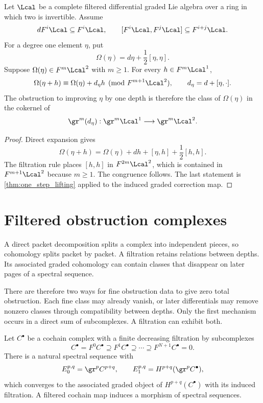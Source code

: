 \begin{proposition}\label{prop:maurer_cartan_lifting}
Let $\Lcal$ be a complete filtered differential graded Lie algebra over a ring in which two is invertible.  Assume
\[
dF^i\Lcal\subseteq F^i\Lcal,
\qquad
[F^i\Lcal,F^j\Lcal]\subseteq F^{i+j}\Lcal.
\]
For a degree one element $\eta$, put
\[
\Omega(\eta)=d\eta+\frac12[\eta,\eta].
\]
Suppose $\Omega(\eta)\in F^m\Lcal^2$ with $m\ge1$.  For every $h\in F^m\Lcal^1$,
\[
\Omega(\eta+h)
\equiv
\Omega(\eta)+d_\eta h
\pmod{F^{m+1}\Lcal^2},
\qquad
d_\eta=d+[\eta,\mathord\cdot].
\]
The obstruction to improving $\eta$ by one depth is therefore the class of $\Omega(\eta)$ in the cokernel of
\[
\gr^m(d_\eta):
\gr^m\Lcal^1
\longrightarrow
\gr^m\Lcal^2.
\]
\end{proposition}

\begin{proof}
Direct expansion gives
\[
\Omega(\eta+h)
=
\Omega(\eta)+dh+[\eta,h]+\frac12[h,h].
\]
The filtration rule places $[h,h]$ in $F^{2m}\Lcal^2$, which is contained in $F^{m+1}\Lcal^2$ because $m\ge1$.  The congruence follows.  The last statement is \cref{thm:one_step_lifting} applied to the induced graded correction map.
\end{proof}

\section{Filtered obstruction complexes}\label{sec:obstruction_spectral_sequence}

A direct packet decomposition splits a complex into independent pieces, so cohomology splits packet by packet. A filtration retains relations between depths. Its associated graded cohomology can contain classes that disappear on later pages of a spectral sequence.

There are therefore two ways for fine obstruction data to give zero total obstruction. Each fine class may already vanish, or later differentials may remove nonzero classes through compatibility between depths. Only the first mechanism occurs in a direct sum of subcomplexes. A filtration can exhibit both.

\begin{standardfact}\label{fact:filtered_spectral_sequence}
Let $C^\bullet$ be a cochain complex with a finite decreasing filtration by subcomplexes
\[
C^\bullet=F^0C^\bullet\supseteq F^1C^\bullet\supseteq\cdots\supseteq F^{N+1}C^\bullet=0.
\]
There is a natural spectral sequence with
\[
E_0^{p,q}=\gr^pC^{p+q},
\qquad
E_1^{p,q}=H^{p+q}(\gr^pC^\bullet),
\]
which converges to the associated graded object of $H^{p+q}(C^\bullet)$ with its induced filtration.  A filtered cochain map induces a morphism of spectral sequences.
\end{standardfact}

